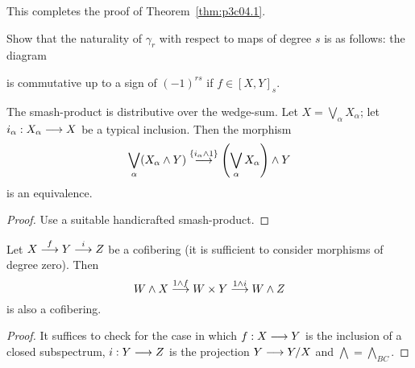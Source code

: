 \documentclass[../main]{subfiles}
\begin{document}
This completes the proof of Theorem~\ref{thm:p3c04.1}.

\begin{exercise}
Show that the naturality of $\gamma_r$ with respect to maps of degree $s$ is as follows: the diagram 

\begin{center}
\end{center}

is commutative up to a sign of $(-1)^{rs}$ if $f \in [X, Y]_s$.
\end{exercise}

\begin{proposition}\label{prop:p3ch04.11}
The smash-product is distributive over the wedge-sum. Let $X = \bigvee_\alpha X_\alpha$; let $i_\alpha : X_\alpha \overset{}{\longrightarrow} X$ be a typical inclusion. Then the morphism $$\bigvee_\alpha (X_\alpha \wedge Y) \overset{\{i_\alpha \wedge 1\}}{\longrightarrow} \left(\bigvee_\alpha X_\alpha\right) \wedge Y$$ is an equivalence. 
\end{proposition}

\begin{proof}
Use a suitable handicrafted smash-product. 
\end{proof}

\begin{proposition}\label{prop:p3ch04.12}
Let $X \overset{f}{\longrightarrow} Y \overset{i}{\longrightarrow} Z$ be a cofibering (it is sufficient to consider morphisms of degree zero). Then $$W \wedge X \overset{1 \wedge f}{\longrightarrow} W \times Y \overset{1 \wedge i}{\longrightarrow} W \wedge Z$$ is also a cofibering.
\end{proposition}

\begin{proof}
It suffices to check for the case in which $f : X \overset{}{\longrightarrow} Y$ is the inclusion of a closed subspectrum, $i : Y \overset{}{\longrightarrow} Z$ is the projection $Y \overset{}{\longrightarrow} Y/X$ and $\bigwedge = \bigwedge_{BC}$.
\end{proof}
\end{document}
